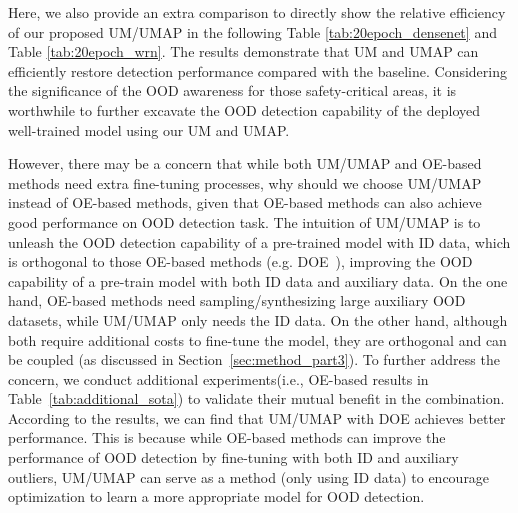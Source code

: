 \documentclass{article}
\theoremstyle{plain}
\theoremstyle{definition}
\theoremstyle{remark}
\begin{document}
Here, we also provide an extra comparison to directly show the relative efficiency of our proposed UM/UMAP in the following Table \ref{tab:20epoch_densenet} and Table \ref{tab:20epoch_wrn}. The results demonstrate that UM and UMAP can efficiently restore detection performance compared with the baseline. Considering the significance of the OOD awareness for those safety-critical areas, it is worthwhile to further excavate the OOD detection capability of the deployed well-trained model using our UM and UMAP. 

However, there may be a concern that while both UM/UMAP and OE-based methods need extra fine-tuning processes, why should we choose UM/UMAP instead of OE-based methods, given that OE-based methods can also achieve good performance on OOD detection task. The intuition of UM/UMAP is to unleash the OOD detection capability of a pre-trained model with ID data, which is orthogonal to those OE-based methods (e.g. DOE~\citep{wang2023outofdistribution}), improving the OOD capability of a pre-train model with both ID data and auxiliary data. On the one hand, OE-based methods need sampling/synthesizing large auxiliary OOD datasets, while UM/UMAP only needs the ID data. On the other hand, although both require additional costs to fine-tune the model, they are orthogonal and can be coupled (as discussed in Section~\ref{sec:method_part3}). To further address the concern, we conduct additional experiments(i.e., OE-based results in Table~\ref{tab:additional_sota}) to validate their mutual benefit in the combination. According to the results, we can find that UM/UMAP with DOE achieves better performance. This is because while OE-based methods can improve the performance of OOD detection by fine-tuning with both ID and auxiliary outliers, UM/UMAP can serve as a method (only using ID data) to encourage optimization to learn a more appropriate model for OOD detection.
\end{document}
